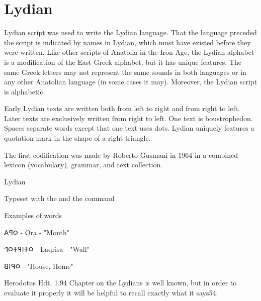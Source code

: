 \section{Lydian}
\label{sec:lydian}
 Lydian script was used to write the Lydian language. That the language preceded the script is indicated by names in Lydian, which must have existed before they were written. Like other scripts of Anatolia in the Iron Age, the Lydian alphabet is a modification of the East Greek alphabet, but it has unique features. The same Greek letters may not represent the same sounds in both languages or in any other Anatolian language (in some cases it may). Moreover, the Lydian script is alphabetic.



Early Lydian texts are written both from left to right and from right to left. Later texts are exclusively written from right to left. One text is boustrophedon. Spaces separate words except that one text uses dots. Lydian uniquely features a quotation mark in the shape of a right triangle.

The first codification was made by Roberto Gusmani in 1964 in a combined lexicon (vocabulary), grammar, and text collection.

\begin{scriptexample}[]{Lydian}

\medskip

Typeset with the  and the command \cmd{\lydian}
\end{scriptexample}

Examples of words

\bgroup\lydian
𐤬𐤭𐤠  - Ora - "Month"

𐤬𐤳𐤦𐤭𐤲𐤬𐤩  - Laqrisa - "Wall"

𐤬𐤭𐤦𐤡  - "House, Home"

\egroup

Herodotus Hdt. 1.94 
Chapter on the Lydians is well known, but in order to evaluate it properly it will be
helpful to recall exactly what it says54:

